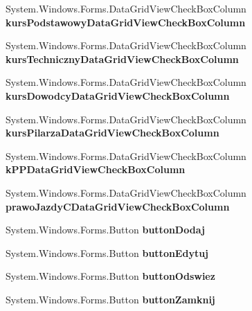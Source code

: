 \begin{DoxyCompactItemize}
System.\+Windows.\+Forms.\+Data\+Grid\+View\+Check\+Box\+Column {\bfseries kurs\+Podstawowy\+Data\+Grid\+View\+Check\+Box\+Column}
\item 
\mbox{\label{class_statystyki___o_s_p_1_1_fireman_list_form_aa5364bc83c8dc3e75178c6b5ba158be2}} 
System.\+Windows.\+Forms.\+Data\+Grid\+View\+Check\+Box\+Column {\bfseries kurs\+Techniczny\+Data\+Grid\+View\+Check\+Box\+Column}
\item 
\mbox{\label{class_statystyki___o_s_p_1_1_fireman_list_form_a2cc5997677f2a4b81202982523278640}} 
System.\+Windows.\+Forms.\+Data\+Grid\+View\+Check\+Box\+Column {\bfseries kurs\+Dowodcy\+Data\+Grid\+View\+Check\+Box\+Column}
\item 
\mbox{\label{class_statystyki___o_s_p_1_1_fireman_list_form_affc9b5a51a5d210768e79c894621f0e7}} 
System.\+Windows.\+Forms.\+Data\+Grid\+View\+Check\+Box\+Column {\bfseries kurs\+Pilarza\+Data\+Grid\+View\+Check\+Box\+Column}
\item 
\mbox{\label{class_statystyki___o_s_p_1_1_fireman_list_form_ac8033f29139d739dca1be6cc23858e05}} 
System.\+Windows.\+Forms.\+Data\+Grid\+View\+Check\+Box\+Column {\bfseries k\+P\+P\+Data\+Grid\+View\+Check\+Box\+Column}
\item 
\mbox{\label{class_statystyki___o_s_p_1_1_fireman_list_form_a770df0feb8ba88f1cae58f3aee451d96}} 
System.\+Windows.\+Forms.\+Data\+Grid\+View\+Check\+Box\+Column {\bfseries prawo\+Jazdy\+C\+Data\+Grid\+View\+Check\+Box\+Column}
\item 
\mbox{\label{class_statystyki___o_s_p_1_1_fireman_list_form_a7ac3154656498ca61cd207da0670d788}} 
System.\+Windows.\+Forms.\+Button {\bfseries button\+Dodaj}
\item 
\mbox{\label{class_statystyki___o_s_p_1_1_fireman_list_form_a6ecec063325b11d5bb62f914a36d2993}} 
System.\+Windows.\+Forms.\+Button {\bfseries button\+Edytuj}
\item 
\mbox{\label{class_statystyki___o_s_p_1_1_fireman_list_form_a05ac72828048f4d047af3879f08489a8}} 
System.\+Windows.\+Forms.\+Button {\bfseries button\+Odswiez}
\item 
\mbox{\label{class_statystyki___o_s_p_1_1_fireman_list_form_a147b3b9f33d8aa73e5d7322df77541b1}} 
System.\+Windows.\+Forms.\+Button {\bfseries button\+Zamknij}
\end{DoxyCompactItemize}


